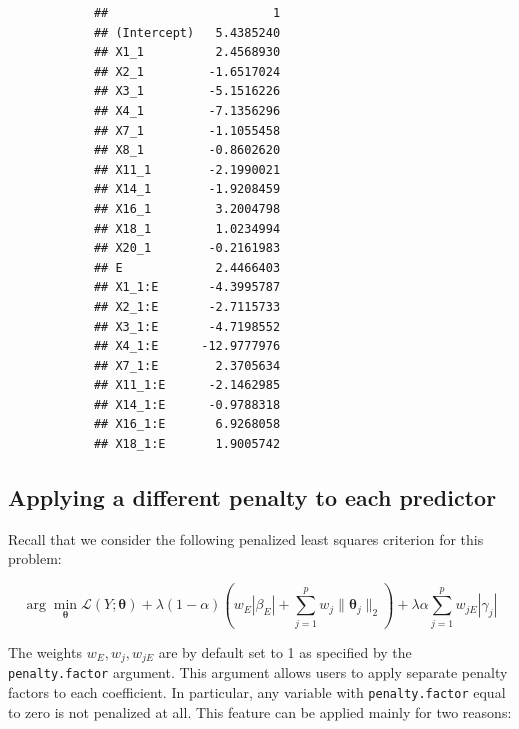 			\begin{knitrout}\scriptsize
			\color{fgcolor}\begin{kframe}
			\begin{alltt}
			  \hlstd{=} \hlstd{,}  \hlstd{=} \hlstd{)}
			\end{alltt}
			\begin{verbatim}
			##                       1
			## (Intercept)   5.4385240
			## X1_1          2.4568930
			## X2_1         -1.6517024
			## X3_1         -5.1516226
			## X4_1         -7.1356296
			## X7_1         -1.1055458
			## X8_1         -0.8602620
			## X11_1        -2.1990021
			## X14_1        -1.9208459
			## X16_1         3.2004798
			## X18_1         1.0234994
			## X20_1        -0.2161983
			## E             2.4466403
			## X1_1:E       -4.3995787
			## X2_1:E       -2.7115733
			## X3_1:E       -4.7198552
			## X4_1:E      -12.9777976
			## X7_1:E        2.3705634
			## X11_1:E      -2.1462985
			## X14_1:E      -0.9788318
			## X16_1:E       6.9268058
			## X18_1:E       1.9005742
			\end{verbatim}
			\end{kframe}
			\end{knitrout}
			
			
			\subsection{Applying a different penalty to each predictor} \label{ap:pfac}
			
			Recall that we consider the following penalized least squares criterion for this problem:
			
			\begin{equation}
			\arg\min_{\boldsymbol{\theta} }  \mathcal{L}(Y;\boldsymbol{\theta}) + \lambda (1-\alpha)  \left( w_E |\beta_E| + \sum_{j=1}^{p} w_j \lVert\boldsymbol{\theta}_j \rVert_2 \right) +  \lambda\alpha \sum_{j=1}^{p} w_{jE} |\gamma_{j}| 
			\end{equation} 
			
			The weights $w_E, w_j, w_{jE}$ are by default set to 1 as specified by the \texttt{penalty.factor} argument. This argument allows users to apply separate penalty factors to each coefficient.  In particular, any variable with \texttt{penalty.factor} equal to zero is not penalized at all. This feature can be applied mainly for two reasons:  
			
